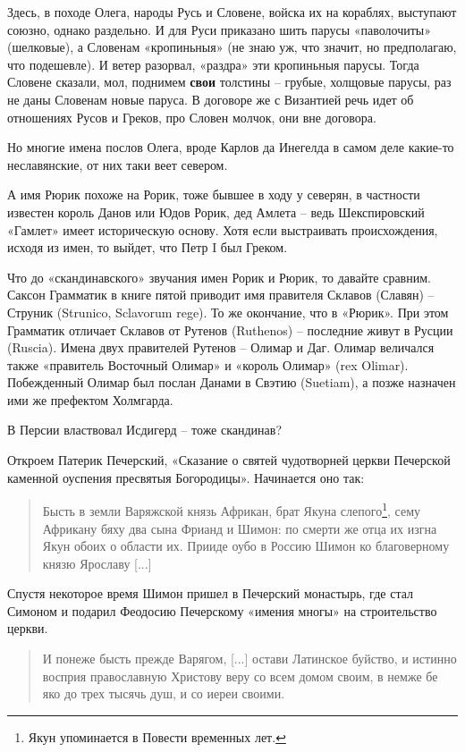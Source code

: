 Здесь, в походе Олега, народы Русь и Словене, войска их на кораблях, выступают союзно, однако раздельно. И для Руси приказано шить парусы «паволочиты» (шелковые), а Словенам «кропиньныя» (не знаю уж, что значит, но предполагаю, что подешевле). И ветер разорвал, «раздра» эти кропиньныя парусы. Тогда Словене сказали, мол, поднимем \textbf{свои} толстины – грубые, холщовые парусы, раз не даны Словенам новые паруса. В договоре же с Византией речь идет об отношениях Русов и Греков, про Словен молчок, они вне договора.

Но многие имена послов Олега, вроде Карлов да Инегелда в самом деле какие-то неславянские, от них таки веет севером. 

А имя Рюрик похоже на Рорик, тоже бывшее в ходу у северян, в частности известен король Данов или Юдов Рорик, дед Амлета – ведь Шекспировский «Гамлет» имеет историческую основу. Хотя если выстраивать происхождения, исходя из имен, то выйдет, что Петр I был Греком.

Что до «скандинавского» звучания имен Рорик и Рюрик, то давайте сравним. Саксон Грамматик в книге пятой приводит имя правителя Склавов (Славян) – Струник (Strunico, Sclavorum rege). То же окончание, что в «Рюрик». При этом Грамматик отличает Склавов от Рутенов (Ruthenos) – последние живут в Русции (Ruscia). Имена двух правителей Рутенов – Олимар и Даг. Олимар величался также «правитель Восточный Олимар» и «король Олимар» (rex Olimar). Побежденный Олимар был послан Данами в Свэтию (Suetiam), а позже назначен ими же префектом Холмгарда.

В Персии властвовал Исдигерд – тоже скандинав?

Откроем Патерик Печерский, «Сказание о святей чудотворней церкви Печерской каменной оуспения пресвятыя Богородицы». Начинается оно так:

\begin{quotation}
Бысть в земли Варяжской князь Африкан, брат Якуна слепого\footnote{Якун упоминается в Повести временных лет.}, сему Африкану бяху два сына Фрианд и Шимон: по смерти же отца их изгна Якун обоих о области их. Прииде оубо в Россию Шимон ко благоверному князю Ярославу [...]\end{quotation}
 
Спустя некоторое время Шимон пришел в Печерский монастырь, где стал Симоном и подарил Феодосию Печерскому «имения многы» на строительство церкви.

\begin{quotation}
И понеже бысть прежде Варягом, [...] остави Латинское буйство, и истинно восприя православную Христову веру со всем домом своим, в немже бе яко до трех тысячь душ, и со иереи своими.
\end{quotation}

